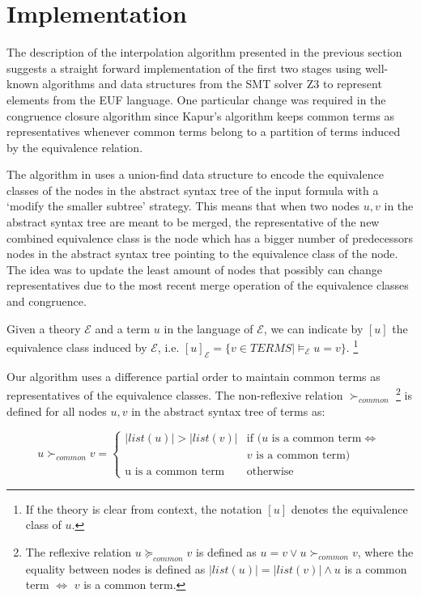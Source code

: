 \section{Implementation}

The description of the interpolation algorithm presented in the
previous section suggests a straight forward implementation
of the first two stages using well-known algorithms 
\cite{10.1145/322186.322198,10.1145/322217.322228} 
and data structures from the SMT
solver Z3 \cite{10.1007/978-3-540-78800-3_24} to represent 
elements from the EUF language. One particular change was 
required in the congruence closure algorithm since Kapur's 
algorithm keeps common terms as representatives
whenever common terms belong to a partition of terms induced
by the equivalence relation.

The algorithm in \cite{10.1145/322217.322228}
uses a union-find data structure to encode the equivalence classes
of the nodes in the abstract syntax tree of the input formula with 
a `modify the smaller subtree' strategy. This means that
when two nodes $u, v$ in the abstract syntax tree are
meant to be merged, the representative of the new 
combined equivalence class is the node which has a bigger
number of predecessors nodes in the abstract
syntax tree pointing to the
equivalence class of the node. The idea was to update the least
amount of nodes that possibly can change representatives
due to the most recent merge operation of the equivalence classes 
and congruence.

\begin{notation}
  Given a theory $\mathcal{E}$ and a term $u$ in the language of 
  $\mathcal{E}$, we can indicate by $[u]$ the equivalence class
  induced by $\mathcal{E}$, i.e. $[u]_{\mathcal{E}} = \{ v \in TERMS | 
  \models_{\mathcal{E}} u = v\}$. \footnote{If the theory
    is clear from context, the notation $[u]$
  denotes the equivalence class of $u$.}
\end{notation}

Our algorithm uses a difference partial order to 
maintain common terms as representatives of 
the equivalence classes. The non-reflexive relation 
$\succ_{common}$ 
\footnote{The reflexive relation $u \succeq_{common} v$
  is defined as $u = v \lor u \succ_{common} v$, where
  the equality between nodes is defined as $|list(u)| = 
  |list(v)| \land u$ is a common term $\iff$ 
  $v$ is a common term.
}
is defined for all nodes $u, v$ in the abstract syntax 
tree of terms as:

\begin{equation*}
  u \succ_{common} v = \begin{cases} 
    |list(u)| > |list(v)| & \text{if }(u \text{ is a common term}\Leftrightarrow \\ 
    & v \text{ is a common term}) \\
    \text{u is a common term} & \text{otherwise}
  \end{cases}
\end{equation*}

